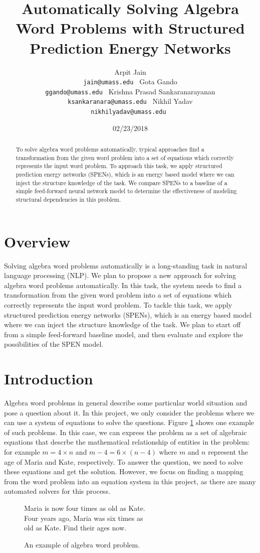 \documentclass[11pt,letterpaper]{article}
\title{Automatically Solving Algebra Word Problems with Structured Prediction Energy Networks}
\author{Arpit Jain\\ {\tt jain@umass.edu }  \And Gota Gando\\ {\tt ggando@umass.edu } \AND Krishna Prasad Sankaranarayanan\\ {\tt ksankaranara@umass.edu }  \And Nikhil Yadav\\
  {\tt nikhilyadav@umass.edu }}
\date{02/23/2018}
\begin{document}
\maketitle


\section{Overview}
Solving algebra word problems automatically is a long-standing task in natural language processing (NLP). We plan to propose a new approach for solving algebra word problems automatically. In this task, the system needs to find a transformation from the given word problem into a set of equations which correctly represents the input word problem. To tackle this task, we apply structured prediction energy networks (SPENs), which is an energy based model where we can inject the structure knowledge of the task. We plan to start off from a simple feed-forward baseline model, and then evaluate and explore the possibilities of the SPEN model.
\fi

\begin{abstract}
To solve algebra word problems automatically, typical approaches find a transformation from the given word problem into a set of equations which correctly represents the input word problem. To approach this task, we apply structured prediction energy networks (SPENs), which is an energy based model where we can inject the structure knowledge of the task. We compare SPENs to a baseline of a simple feed-forward neural network model to determine the effectiveness of modeling structural dependencies in this problem.
\end{abstract}
\section{Introduction}
Algebra word problems in general describe some particular world situation and pose a question about it. In this project, we only consider the problems where we can use a system of equations to solve the questions. Figure \ref{algebra-example} shows one example of such problems. In this case, we can express the problem as a set of algebraic equations that descrbe the mathematical relationship of entities in the problem: for example $m = 4 \times n$ and $m-4 = 6 \times (n-4)$ where $m$ and $n$ represent the age of Maria and Kate, respectively. To answer the question, we need to solve these equations and get the solution. However, we focus on finding a mapping from the word problem into an equation system in this project, as there are many automated solvers for this process.
\begin{figure}[ht]
	\centering
	Maria is now four times as old as Kate.\\
Four years ago, Maria was six times as\\
old as Kate. Find their ages now.\\
	\caption{An example of algebra word problem.}
    \label{algebra-example}
\end{figure}
\end{document}
